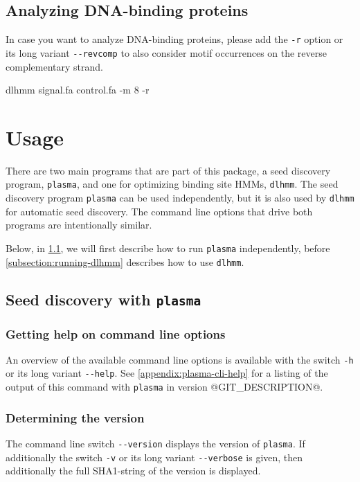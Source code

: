 \documentclass[a4paper]{article}
\makeatletter
\newcommand{\plasma}[0]{\texttt{plasma}}
\newcommand{\dlhmm}[0]{\texttt{dlhmm}}
\newcommand{\version}[0]{@GIT_DESCRIPTION@}
\makeatother
\begin{document}
\subsection{Analyzing DNA-binding proteins}
In case you want to analyze DNA-binding proteins, please add the \verb|-r| option or its long variant \verb|--revcomp| to also consider motif occurrences on the reverse complementary strand.\\
\begin{verbbox}
dlhmm signal.fa control.fa -m 8 -r
\end{verbbox}
\fbox{\theverbbox[t]}

\section{Usage}
There are two main programs that are part of this package, a seed discovery program, \plasma{}, and one for optimizing binding site HMMs, \dlhmm{}.
The seed discovery program \plasma{} can be used independently, but it is also used by \dlhmm{} for automatic seed discovery.
The command line options that drive both programs are intentionally similar.

Below, in \cref{subsection:running-plasma}, we will first describe how to run \plasma{} independently, before \cref{subsection:running-dlhmm} describes how to use \dlhmm{}.

\subsection{Seed discovery with \plasma{}}
\label{subsection:running-plasma}
\subsubsection{Getting help on command line options}
An overview of the available command line options is available with the switch \verb|-h| or its long variant \verb|--help|.
See \cref{appendix:plasma-cli-help} for a listing of the output of this command with \plasma{} in version \version{}.
\subsubsection{Determining the version}
The command line switch \verb|--version| displays the version of \plasma{}.
If additionally the switch \verb|-v| or its long variant \verb|--verbose| is given, then additionally the full SHA1-string of the version is displayed.
\end{document}
